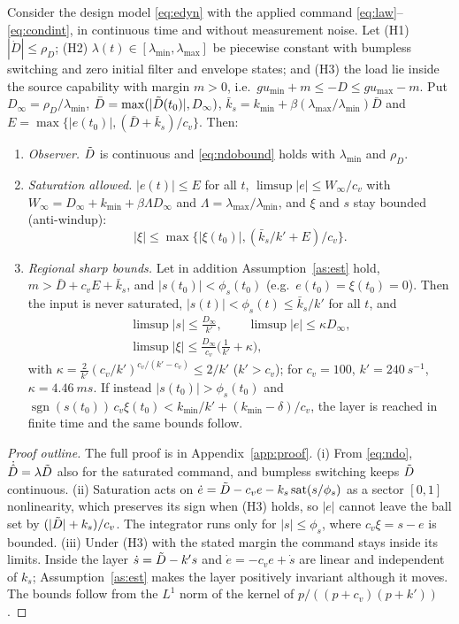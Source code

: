 \begin{proposition}\label{prop:uub}
Consider the design model \eqref{eq:edyn} with the applied command \eqref{eq:law}--\eqref{eq:condint}, in continuous time and without measurement noise. Let (H1) $|\dot D|\le\rho_D$; (H2) $\lambda(t)\in[\lambda_{\min},\lambda_{\max}]$ be piecewise constant with bumpless switching and zero initial filter and envelope states; and (H3) the load lie inside the source capability with margin $m>0$, i.e.\ $gu_{\min}+m\le-D\le gu_{\max}-m$. Put $D_\infty=\rho_D/\lambda_{\min}$, $\bar D=\max(|\tilde{D}(t_0)|,D_\infty)$, $\bar k_s=k_{\min}+\beta(\lambda_{\max}/\lambda_{\min})\bar D$ and $E=\max\{|e(t_0)|,(\bar D+\bar k_s)/c_v\}$. Then:
\begin{enumerate}
\item[(i)] \emph{Observer.} $\tilde{D}$ is continuous and \eqref{eq:ndobound} holds with $\lambda_{\min}$ and $\rho_D$.
\item[(ii)] \emph{Saturation allowed.} $|e(t)|\le E$ for all $t$,
$\limsup|e|\le W_\infty/c_v$ with $W_\infty=D_\infty+k_{\min}+\beta\Lambda D_\infty$ and $\Lambda=\lambda_{\max}/\lambda_{\min}$,
and $\xi$ and $s$ stay bounded (anti-windup):
\[
|\xi|\le\max\{|\xi(t_0)|,(\bar k_s/k'+E)/c_v\}.
\]
\item[(iii)] \emph{Regional sharp bounds.} Let in addition Assumption~\ref{as:est} hold, $m>\bar D+c_vE+\bar k_s$, and $|s(t_0)|<\phi_s(t_0)$ (e.g.\ $e(t_0)=\xi(t_0)=0$). Then the input is never saturated, $|s(t)|<\phi_s(t)\le\bar k_s/k'$ for all $t$, and
\begin{gather*}
\limsup|s|\le\frac{D_\infty}{k'},\qquad \limsup|e|\le\kappa D_\infty,\\
\limsup|\xi|\le\frac{D_\infty}{c_v}\Big(\frac1{k'}+\kappa\Big),
\end{gather*}
with $\kappa=\frac{2}{k'}(c_v/k')^{c_v/(k'-c_v)}\le 2/k'$ ($k'>c_v$); for $c_v=100$, $k'=\SI{240}{s^{-1}}$, $\kappa=\SI{4.46}{ms}$. If instead $|s(t_0)|>\phi_s(t_0)$ and $\operatorname{sgn}(s(t_0))\,c_v\xi(t_0)<k_{\min}/k'+(k_{\min}-\delta)/c_v$, the layer is reached in finite time and the same bounds follow.
\end{enumerate}
\end{proposition}
\begin{proof}[Proof outline]
The full proof is in Appendix~\ref{app:proof}. (i) From \eqref{eq:ndo}, $\dot{\hat{D}}=\lambda\tilde{D}$ also for the saturated command, and bumpless switching keeps $\tilde{D}$ continuous. (ii) Saturation acts on $\dot e=\tilde{D}-c_ve-k_s\,\mathrm{sat}(s/\phi_s)$ as a sector $[0,1]$ nonlinearity, which preserves its sign when (H3) holds, so $|e|$ cannot leave the ball set by $(|\tilde{D}|+k_s)/c_v$. The integrator runs only for $|s|\le\phi_s$, where $c_v\xi=s-e$ is bounded. (iii) Under (H3) with the stated margin the command stays inside its limits. Inside the layer $\dot s=\tilde{D}-k's$ and $\dot e=-c_ve+\dot s$ are linear and independent of $k_s$; Assumption~\ref{as:est} makes the layer positively invariant although it moves. The bounds follow from the $L^1$ norm of the kernel of $p/((p+c_v)(p+k'))$.
\end{proof}


